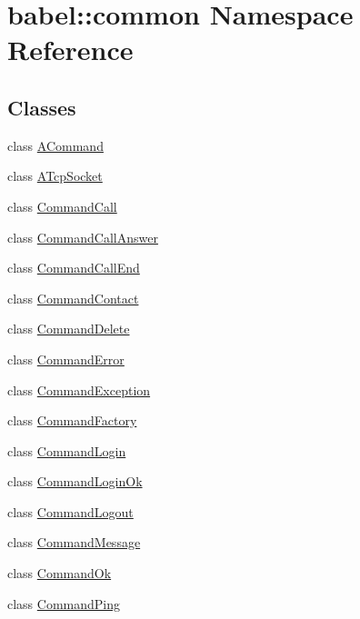 \hypertarget{namespacebabel_1_1common}{}\section{babel\+:\+:common Namespace Reference}
\label{namespacebabel_1_1common}
\subsection*{Classes}
\begin{DoxyCompactItemize}
\item 
class \mbox{\hyperlink{classbabel_1_1common_1_1_a_command}{A\+Command}}
\item 
class \mbox{\hyperlink{classbabel_1_1common_1_1_a_tcp_socket}{A\+Tcp\+Socket}}
\item 
class \mbox{\hyperlink{classbabel_1_1common_1_1_command_call}{Command\+Call}}
\item 
class \mbox{\hyperlink{classbabel_1_1common_1_1_command_call_answer}{Command\+Call\+Answer}}
\item 
class \mbox{\hyperlink{classbabel_1_1common_1_1_command_call_end}{Command\+Call\+End}}
\item 
class \mbox{\hyperlink{classbabel_1_1common_1_1_command_contact}{Command\+Contact}}
\item 
class \mbox{\hyperlink{classbabel_1_1common_1_1_command_delete}{Command\+Delete}}
\item 
class \mbox{\hyperlink{classbabel_1_1common_1_1_command_error}{Command\+Error}}
\item 
class \mbox{\hyperlink{classbabel_1_1common_1_1_command_exception}{Command\+Exception}}
\item 
class \mbox{\hyperlink{classbabel_1_1common_1_1_command_factory}{Command\+Factory}}
\item 
class \mbox{\hyperlink{classbabel_1_1common_1_1_command_login}{Command\+Login}}
\item 
class \mbox{\hyperlink{classbabel_1_1common_1_1_command_login_ok}{Command\+Login\+Ok}}
\item 
class \mbox{\hyperlink{classbabel_1_1common_1_1_command_logout}{Command\+Logout}}
\item 
class \mbox{\hyperlink{classbabel_1_1common_1_1_command_message}{Command\+Message}}
\item 
class \mbox{\hyperlink{classbabel_1_1common_1_1_command_ok}{Command\+Ok}}
\item 
class \mbox{\hyperlink{classbabel_1_1common_1_1_command_ping}{Command\+Ping}}

\end{DoxyCompactItemize}

